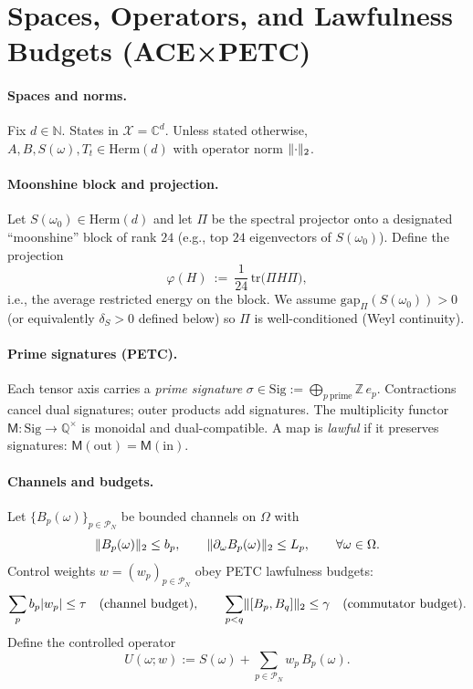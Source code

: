 \documentclass[11pt]{article}
\DeclarePairedDelimiter{\norm}{\lVert}{\rVert}
\newcommand{\C}{\mathbb{C}}
\newcommand{\Herm}[1]{\mathrm{Herm}(#1)}
\newcommand{\Tr}{\mathrm{tr}}
\newcommand{\gapPi}[1]{\mathrm{gap}_{\Pi}\!\left(#1\right)}
\newcommand{\MoonRank}{24}         %
\newcommand{\MoonProj}{\Pi}        %
\theoremstyle{plain}
\theoremstyle{definition}
\theoremstyle{remark}
\begin{document}
\section{Spaces, Operators, and Lawfulness Budgets (ACE×PETC)}
\label{sec:types}
\paragraph{Spaces and norms.}
Fix $d\in\mathbb{N}$. States in $\mathcal{X}=\C^d$. Unless stated otherwise, $A,B,S(\omega),T_t\in\Herm{d}$ with operator norm $\norm{\cdot}_2$.

\paragraph{Moonshine block and projection.}
Let $S(\omega_0)\in\Herm{d}$ and let $\MoonProj$ be the spectral projector onto a designated ``moonshine'' block of rank $\MoonRank$ (e.g., top $\MoonRank$ eigenvectors of $S(\omega_0)$). Define the projection
\[
\varphi(H)\ :=\ \frac{1}{\MoonRank}\,\Tr\!\big(\MoonProj H \MoonProj\big),
\]
i.e., the average restricted energy on the block. We assume $\gapPi{S(\omega_0)}>0$ (or equivalently $\delta_S>0$ defined below) so $\MoonProj$ is well-conditioned (Weyl continuity).

\paragraph{Prime signatures (PETC).}
Each tensor axis carries a \emph{prime signature} $\sigma\in\mathrm{Sig}:=\bigoplus_{p\ \mathrm{prime}}\mathbb{Z}\,e_p$. Contractions cancel dual signatures; outer products add signatures. The multiplicity functor $\mathsf{M}:\mathrm{Sig}\to \mathbb{Q}^\times$ is monoidal and dual-compatible. A map is \emph{lawful} if it preserves signatures: $\mathsf{M}(\mathrm{out})=\mathsf{M}(\mathrm{in})$.

\paragraph{Channels and budgets.}
Let $\{B_p(\omega)\}_{p\in\mathcal{P}_N}$ be bounded channels on $\Omega$ with
\[
\norm{B_p(\omega)}_2\le b_p,\qquad \norm{\partial_\omega B_p(\omega)}_2\le L_p,\qquad \forall \omega\in\Omega.
\]
Control weights $w=(w_p)_{p\in\mathcal{P}_N}$ obey PETC lawfulness budgets:
\[
\sum_{p} b_p|w_p|\le \tau \quad\text{(channel budget)},\qquad 
\sum_{p<q}\norm{[B_p,B_q]}_2\le \gamma \quad\text{(commutator budget)}.
\]
Define the controlled operator
\[
U(\omega;w):=S(\omega)+\sum_{p\in\mathcal{P}_N} w_p\,B_p(\omega).
\]
\end{document}
